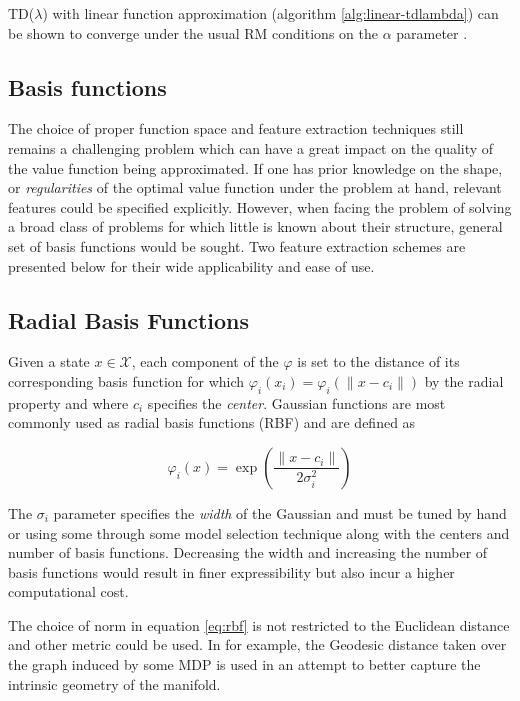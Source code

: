 \documentclass[12pt, oneside, extrafontsizes]{memoir}  %
\theoremstyle{plain}
\theoremstyle{definition}
\begin{document}
TD($\lambda$) with linear function approximation (algorithm \ref{alg:linear-tdlambda}) can be shown to converge under the usual RM conditions on the $\alpha$
parameter \cite{Tsitsiklis1997}.

\subsection{Basis functions}

The choice of proper function space and feature extraction techniques still remains a
challenging problem which can have a great impact on the quality of the value function
being approximated. If one has prior knowledge on the shape, or \textit{regularities}
of the optimal value function under the problem at hand, relevant features could be
specified explicitly. However, when facing the problem of solving a broad class of
problems for which little is known about their structure, general set of basis functions
would be sought. Two feature extraction schemes are presented below for their wide
applicability and ease of use. 

\subsection{Radial Basis Functions}

Given a state $x \in \mathcal{X}$, each component of the $\varphi$ is set to the
distance of its corresponding basis function for which $\varphi_i(x_i) = \varphi_i(\|x -
c_i\|)$ by the radial property and where $c_i$ specifies the \textit{center}. Gaussian
functions are most commonly used as radial basis functions (RBF) and are defined as

\begin{equation}
\varphi_i(x) = \exp\left( \frac{\| x - c_i\|}{2\sigma_i^2}\right)
\label{eq:rbf}
\end{equation}

The $\sigma_i$ parameter specifies the \textit{width} of the Gaussian and must be
tuned by hand or using some through some model selection technique along with the
centers and number of basis functions. Decreasing the width and increasing the
number of basis functions would result in finer expressibility but also incur a higher
computational cost. 

The choice of norm in equation \ref{eq:rbf} is not restricted to the Euclidean distance
and other metric could be used. In \cite{Sugiyama2008} for example, the Geodesic
distance taken over the graph induced by some MDP is used in an attempt to better
capture the intrinsic geometry of the manifold.
 
\end{document}
